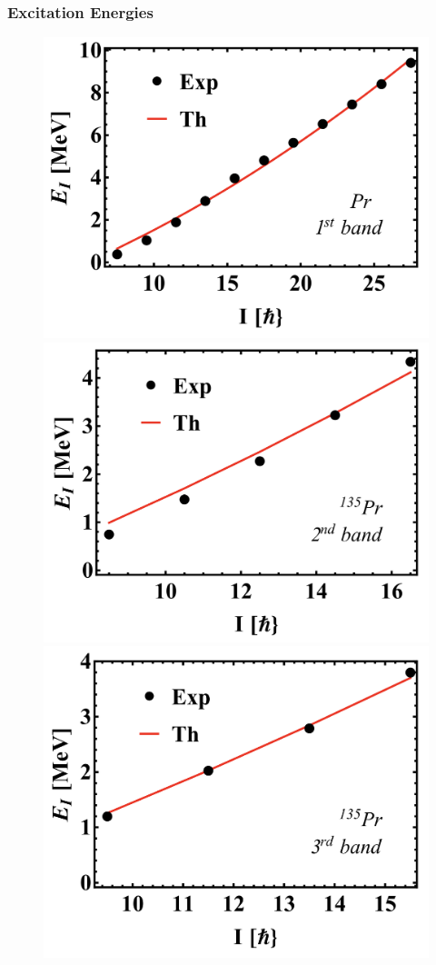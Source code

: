 \documentclass{beamer}
\begin{document}
\begin{frame}
  \frametitle{Excitation Energies}
\begin{figure}
  \includegraphics[scale=0.18]{figures/energy_1.png}
  \includegraphics[scale=0.18]{figures/energy-2.png}
  \includegraphics[scale=0.18]{figures/energy-3.png}
\end{figure}
\end{frame}
\end{document}
